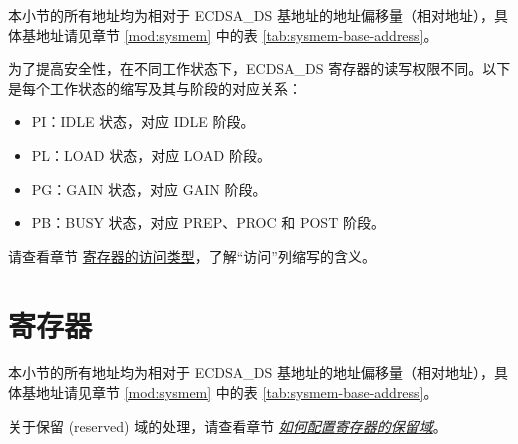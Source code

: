\documentclass[main\_\_CN.tex]{subfiles}
\begin{document}
本小节的所有地址均为相对于 ECDSA\_DS 基地址的地址偏移量（相对地址），具体基地址请见章节 \ref{mod:sysmem} \textit{} 中的表 \ref{tab:sysmem-base-address}。

为了提高安全性，在不同工作状态下，ECDSA\_DS 寄存器的读写权限不同。以下是每个工作状态的缩写及其与阶段的对应关系：

\begin{itemize}
    \item PI：IDLE 状态，对应 IDLE 阶段。
    \item PL：LOAD 状态，对应 LOAD 阶段。
    \item PG：GAIN 状态，对应 GAIN 阶段。
    \item PB：BUSY 状态，对应 PREP、PROC 和 POST 阶段。
\end{itemize}

请查看章节 \hyperref[glossary-access-types]{寄存器的访问类型}，了解“访问”列缩写的含义。






\newpage
\section{寄存器}

本小节的所有地址均为相对于 ECDSA\_DS 基地址的地址偏移量（相对地址），具体基地址请见章节 \ref{mod:sysmem} \textit{} 中的表 \ref{tab:sysmem-base-address}。

关于保留 (reserved) 域的处理，请查看章节 \hyperref[programming-reserved-field]{\textit{如何配置寄存器的保留域}}。


\end{document}
